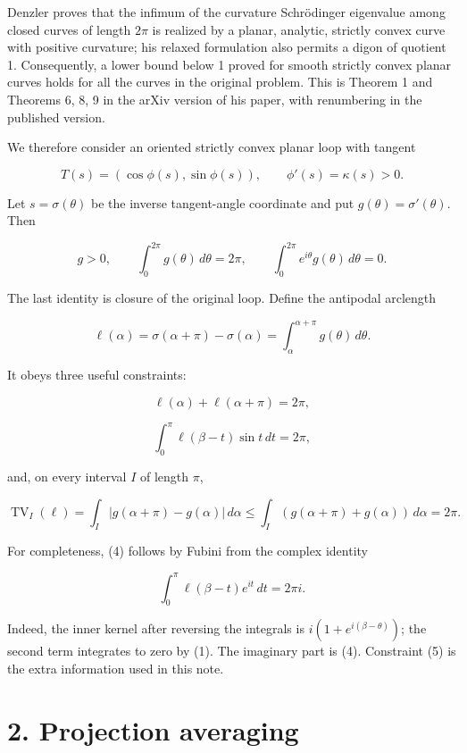 \documentclass[11pt,a4paper]{article}
\begin{document}
Denzler proves that the infimum of the curvature Schrödinger eigenvalue
among closed curves of length \(2\pi\) is realized by a planar,
analytic, strictly convex curve with positive curvature; his relaxed
formulation also permits a digon of quotient 1. Consequently, a lower
bound below 1 proved for smooth strictly convex planar curves holds for
all the curves in the original problem. This is Theorem 1 and Theorems
6, 8, 9 in the arXiv version of his paper, with renumbering in the
published version.

We therefore consider an oriented strictly convex planar loop with
tangent

\[
T(s)=(\cos\phi(s),\sin\phi(s)),\qquad
\phi'(s)=\kappa(s)>0.
\]

Let \(s=\sigma(\theta)\) be the inverse tangent-angle coordinate and put
\(g(\theta)=\sigma'(\theta)\). Then

\[
g>0,\qquad \int_0^{2\pi}g(\theta)\,d\theta=2\pi,
\qquad \int_0^{2\pi} e^{i\theta}g(\theta)\,d\theta=0.
\tag{1}
\]

The last identity is closure of the original loop. Define the antipodal
arclength

\[
\ell(\alpha)=\sigma(\alpha+\pi)-\sigma(\alpha)
            =\int_\alpha^{\alpha+\pi}g(\theta)\,d\theta.
\tag{2}
\]

It obeys three useful constraints:

\[
\ell(\alpha)+\ell(\alpha+\pi)=2\pi,
\tag{3}
\]

\[
\int_0^\pi \ell(\beta-t)\sin t\,dt=2\pi,
\tag{4}
\]

and, on every interval \(I\) of length \(\pi\),

\[
\operatorname{TV}_{I}(\ell)
=\int_I|g(\alpha+\pi)-g(\alpha)|\,d\alpha
\le\int_I(g(\alpha+\pi)+g(\alpha))\,d\alpha
=2\pi.
\tag{5}
\]

For completeness, (4) follows by Fubini from the complex identity

\[
\int_0^\pi \ell(\beta-t)e^{it}\,dt=2\pi i.
\]

Indeed, the inner kernel after reversing the integrals is
\(i(1+e^{i(\beta-\theta)})\); the second term integrates to zero by (1).
The imaginary part is (4). Constraint (5) is the extra information used
in this note.

\hypertarget{1034-projection-averaging}{%
\section{2. Projection averaging}\label{1034-projection-averaging}}
\end{document}
